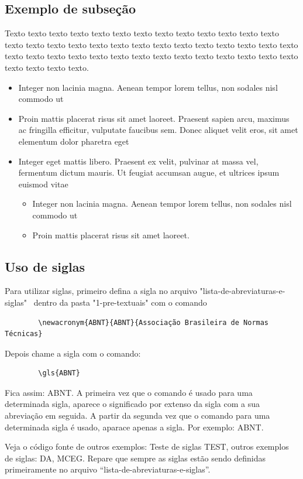 \subsection{Exemplo de subseção} \label{sec:ex_sec}
	
    Texto texto texto texto texto texto texto texto texto texto texto texto texto texto texto texto texto texto texto texto texto texto texto texto texto texto texto texto texto texto texto texto texto texto texto texto texto texto texto texto texto texto texto texto texto.



    \begin{itemize}
	    \item Integer non lacinia magna. Aenean tempor lorem tellus, non sodales nisl commodo ut
	    \item Proin mattis placerat risus sit amet laoreet. Praesent sapien arcu, maximus ac fringilla efficitur, vulputate faucibus sem. Donec aliquet velit eros, sit amet elementum dolor pharetra eget
	    \item Integer eget mattis libero. Praesent ex velit, pulvinar at massa vel, fermentum dictum mauris. Ut feugiat accumsan augue, et ultrices ipsum euismod vitae
	    \begin{itemize}
		    \item Integer non lacinia magna. Aenean tempor lorem tellus, non sodales nisl commodo ut
		    \item Proin mattis placerat risus sit amet laoreet.
	    \end{itemize}
    \end{itemize}

\subsection{Uso de siglas} \label{sec:siglas}

    Para utilizar siglas, primeiro defina a sigla no arquivo "lista-de-abreviaturas-e-siglas"~ dentro da pasta "1-pre-textuais" com o comando 
    \begin{verbatim}
        \newacronym{ABNT}{ABNT}{Associação Brasileira de Normas Técnicas}
    \end{verbatim}
    Depois chame a sigla com o comando:
    \begin{verbatim}
        \gls{ABNT}
    \end{verbatim}
    Fica assim: \gls{ABNT}. A primeira vez que o comando é usado para uma determinada sigla, aparece o significado por extenso da sigla com a sua abreviação em seguida. A partir da segunda vez que o comando para uma determinada sigla é usado, aparace apenas a sigla. Por exemplo: \gls{ABNT}.  
    
    Veja o código fonte de outros exemplos: Teste de siglas \gls{TEST}, outros exemplos de siglas: \gls{DA}, \gls{MCEG}. 
    Repare que sempre as siglas estão sendo definidas primeiramente no arquivo ``lista-de-abreviaturas-e-siglas''.